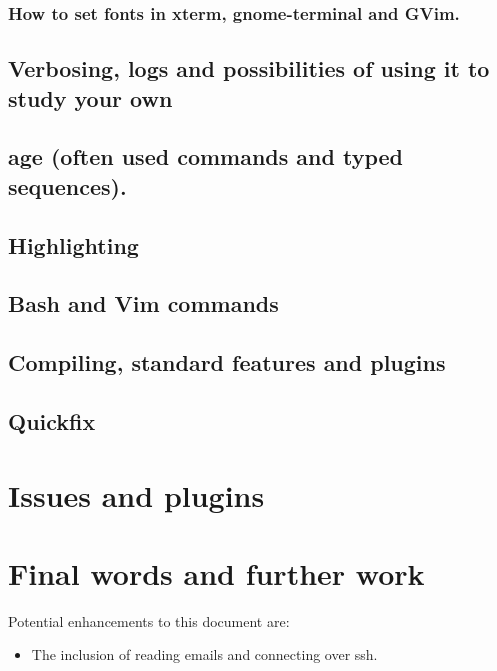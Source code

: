 \documentclass{article}
\begin{document}
\subsubsection{How to set fonts in xterm, gnome-terminal and GVim.}
\subsection{Verbosing, logs and possibilities of using it to study your own}
\subsection{age (often used commands and typed sequences).}
\subsection{Highlighting}
\subsection{Bash and Vim commands}
\subsection{Compiling, standard features and plugins}
\subsection{Quickfix}
\section{Issues and plugins}\label{issues}

\section{Final words and further work}

Potential enhancements to this document are:
\begin{itemize}
  \item The inclusion of reading emails and connecting over ssh.
\end{itemize}
\end{document}
